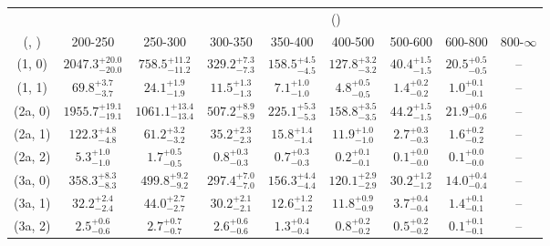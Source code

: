 \begin{table}[h!]
\tiny
\centering
{}
\begin{tabular}
{ccccccccc}
	\hline\hline
&	& \multicolumn{8}{c}{\scalht (\gev)} \\ 
	 (\njet,  \nb) & 200-250 & 250-300 & 300-350 & 350-400 & 400-500 & 500-600 & 600-800 & 800-$\infty$ \\ [0.8ex] 
\hline
	(1, 0) & $2047.3^{+ 20.0 }_{- 20.0 }$ & $758.5^{+ 11.2 }_{- 11.2 }$ & $329.2^{+ 7.3 }_{- 7.3 }$ & $158.5^{+ 4.5 }_{- 4.5 }$ & $127.8^{+ 3.2 }_{- 3.2 }$ & $40.4^{+ 1.5 }_{- 1.5 }$ & $20.5^{+ 0.5 }_{- 0.5 }$ & -- \\[0.5ex] 
	(1, 1) & $69.8^{+ 3.7 }_{- 3.7 }$ & $24.1^{+ 1.9 }_{- 1.9 }$ & $11.5^{+ 1.3 }_{- 1.3 }$ & $7.1^{+ 1.0 }_{- 1.0 }$ & $4.8^{+ 0.5 }_{- 0.5 }$ & $1.4^{+ 0.2 }_{- 0.2 }$ & $1.0^{+ 0.1 }_{- 0.1 }$ & -- \\[0.5ex] 
	(2a, 0) & $1955.7^{+ 19.1 }_{- 19.1 }$ & $1061.1^{+ 13.4 }_{- 13.4 }$ & $507.2^{+ 8.9 }_{- 8.9 }$ & $225.1^{+ 5.3 }_{- 5.3 }$ & $158.8^{+ 3.5 }_{- 3.5 }$ & $44.2^{+ 1.5 }_{- 1.5 }$ & $21.9^{+ 0.6 }_{- 0.6 }$ & -- \\[0.5ex] 
	(2a, 1) & $122.3^{+ 4.8 }_{- 4.8 }$ & $61.2^{+ 3.2 }_{- 3.2 }$ & $35.2^{+ 2.3 }_{- 2.3 }$ & $15.8^{+ 1.4 }_{- 1.4 }$ & $11.9^{+ 1.0 }_{- 1.0 }$ & $2.7^{+ 0.3 }_{- 0.3 }$ & $1.6^{+ 0.2 }_{- 0.2 }$ & -- \\[0.5ex] 
	(2a, 2) & $5.3^{+ 1.0 }_{- 1.0 }$ & $1.7^{+ 0.5 }_{- 0.5 }$ & $0.8^{+ 0.3 }_{- 0.3 }$ & $0.7^{+ 0.3 }_{- 0.3 }$ & $0.2^{+ 0.1 }_{- 0.1 }$ & $0.1^{+ 0.0 }_{- 0.0 }$ & $0.1^{+ 0.0 }_{- 0.0 }$ & -- \\[0.5ex] 
	(3a, 0) & $358.3^{+ 8.3 }_{- 8.3 }$ & $499.8^{+ 9.2 }_{- 9.2 }$ & $297.4^{+ 7.0 }_{- 7.0 }$ & $156.3^{+ 4.4 }_{- 4.4 }$ & $120.1^{+ 2.9 }_{- 2.9 }$ & $30.2^{+ 1.2 }_{- 1.2 }$ & $14.0^{+ 0.4 }_{- 0.4 }$ & -- \\[0.5ex] 
	(3a, 1) & $32.2^{+ 2.4 }_{- 2.4 }$ & $44.0^{+ 2.7 }_{- 2.7 }$ & $30.2^{+ 2.1 }_{- 2.1 }$ & $12.6^{+ 1.2 }_{- 1.2 }$ & $11.8^{+ 0.9 }_{- 0.9 }$ & $3.7^{+ 0.4 }_{- 0.4 }$ & $1.4^{+ 0.1 }_{- 0.1 }$ & -- \\[0.5ex] 
	(3a, 2) & $2.5^{+ 0.6 }_{- 0.6 }$ & $2.7^{+ 0.7 }_{- 0.7 }$ & $2.6^{+ 0.6 }_{- 0.6 }$ & $1.3^{+ 0.4 }_{- 0.4 }$ & $0.8^{+ 0.2 }_{- 0.2 }$ & $0.5^{+ 0.2 }_{- 0.2 }$ & $0.1^{+ 0.1 }_{- 0.1 }$ & -- \\[0.5ex] 

\end{tabular}
\end{table}
